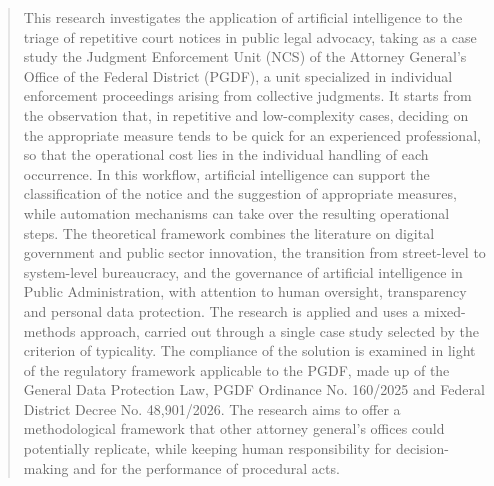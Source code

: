 
\begin{abstract}
This research investigates the application of artificial intelligence to the
triage of repetitive court notices in public legal advocacy, taking as a case
study the Judgment Enforcement Unit (NCS) of the Attorney General's Office of
the Federal District (PGDF), a unit specialized in individual enforcement
proceedings arising from collective judgments. It starts from the observation
that, in repetitive and low-complexity cases, deciding on the appropriate
measure tends to be quick for an experienced professional, so that the
operational cost lies in the individual handling of each occurrence. In this
workflow, artificial intelligence can support the classification of the notice
and the suggestion of appropriate measures, while automation mechanisms can
take over the resulting operational steps. The theoretical framework combines
the literature on digital government and public sector innovation, the
transition from street-level to system-level bureaucracy, and the governance
of artificial intelligence in Public Administration, with attention to human
oversight, transparency and personal data protection. The research is applied
and uses a mixed-methods approach, carried out through a single case study
selected by the criterion of typicality. The compliance of the solution is
examined in light of the regulatory framework applicable to the PGDF, made up
of the General Data Protection Law, PGDF Ordinance No. 160/2025 and Federal
District Decree No. 48,901/2026. The research aims to offer a methodological
framework that other attorney general's offices could potentially replicate,
while keeping human responsibility for decision-making and for the performance
of procedural acts.
\end{abstract}
